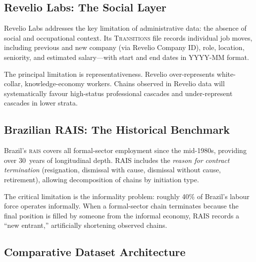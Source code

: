 \documentclass[a4paper]{tufte-handout}
\begin{document}
\subsection{Revelio Labs: The Social Layer}

Revelio Labs addresses the key limitation of administrative data: the absence of social and occupational context.
Its \textsc{Transitions} file records individual job moves, including previous and new company (via Revelio Company ID), role, location, seniority, and estimated salary---with start and end dates in YYYY-MM format.

The principal limitation is representativeness. Revelio over-represents white-collar, knowledge-economy workers. Chains observed in Revelio data will systematically favour high-status professional cascades and under-represent cascades in lower strata.


\subsection{Brazilian RAIS: The Historical Benchmark}

Brazil's \textsc{rais} covers all formal-sector employment since the mid-1980s, providing over 30~years of longitudinal depth.
RAIS includes the \emph{reason for contract termination} (resignation, dismissal with cause, dismissal without cause, retirement), allowing decomposition of chains by initiation type.

The critical limitation is the informality problem: roughly 40\% of Brazil's labour force operates informally. When a formal-sector chain terminates because the final position is filled by someone from the informal economy, RAIS records a ``new entrant,'' artificially shortening observed chains.


\subsection{Comparative Dataset Architecture}
\end{document}
